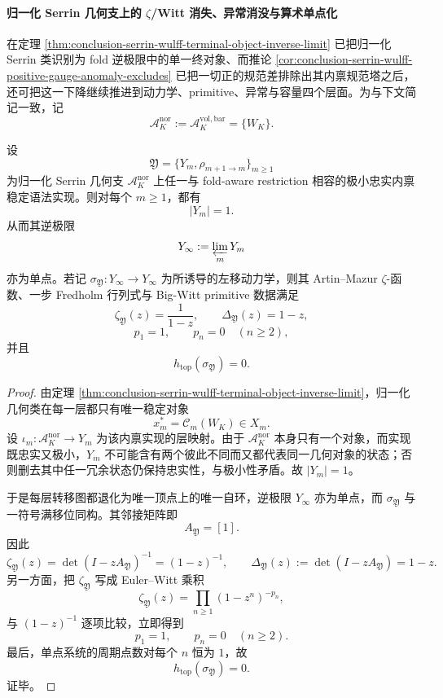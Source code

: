 \paragraph{归一化 Serrin 几何支上的 \texorpdfstring{$\zeta$}{zeta}/Witt 消失、异常消没与算术单点化}
在定理 \ref{thm:conclusion-serrin-wulff-terminal-object-inverse-limit} 已把归一化 Serrin 类识别为 fold 逆极限中的单一终对象、而推论 \ref{cor:conclusion-serrin-wulff-positive-gauge-anomaly-excludes} 已把一切正的规范差排除出其内禀规范塔之后，还可把这一下降继续推进到动力学、primitive、异常与容量四个层面。为与下文简记一致，记
\[
\mathcal A_K^{\mathrm{nor}}:=\mathcal A_K^{\mathrm{vol,bar}}=\{W_K\}.
\]

\begin{theorem}\label{thm:conclusion-serrin-wulff-artin-mazur-witt-triple-collapse}
设
\[
\mathfrak Y=\{Y_m,\rho_{m+1\to m}\}_{m\ge 1}
\]
为归一化 Serrin 几何支 \(\mathcal A_K^{\mathrm{nor}}\) 上任一与 fold-aware restriction 相容的极小忠实内禀稳定语法实现。则对每个 \(m\ge 1\)，都有
\[
|Y_m|=1.
\]
从而其逆极限
\[
Y_\infty:=\varprojlim_m Y_m
\]
亦为单点。若记 \(\sigma_{\mathfrak Y}:Y_\infty\to Y_\infty\) 为所诱导的左移动力学，则其 Artin--Mazur \(\zeta\)-函数、一步 Fredholm 行列式与 Big-Witt primitive 数据满足
\[
\zeta_{\mathfrak Y}(z)=\frac{1}{1-z},
\qquad
\Delta_{\mathfrak Y}(z)=1-z,
\]
\[
p_1=1,
\qquad
p_n=0\quad(n\ge 2),
\]
并且
\[
h_{\mathrm{top}}(\sigma_{\mathfrak Y})=0.
\]
\end{theorem}
\begin{proof}
由定理 \ref{thm:conclusion-serrin-wulff-terminal-object-inverse-limit}，归一化几何类在每一层都只有唯一稳定对象
\[
x_m^\ast=\mathscr C_m(W_K)\in X_m.
\]
设 \(\iota_m:\mathcal A_K^{\mathrm{nor}}\to Y_m\) 为该内禀实现的层映射。由于 \(\mathcal A_K^{\mathrm{nor}}\) 本身只有一个对象，而实现既忠实又极小，\(Y_m\) 不可能含有两个彼此不同而又都代表同一几何对象的状态；否则删去其中任一冗余状态仍保持忠实性，与极小性矛盾。故 \(|Y_m|=1\)。

于是每层转移图都退化为唯一顶点上的唯一自环，逆极限 \(Y_\infty\) 亦为单点，而 \(\sigma_{\mathfrak Y}\) 与一符号满移位同构。其邻接矩阵即
\[
A_{\mathfrak Y}=[1].
\]
因此
\[
\zeta_{\mathfrak Y}(z)
=
\det(I-zA_{\mathfrak Y})^{-1}
=
(1-z)^{-1},
\qquad
\Delta_{\mathfrak Y}(z):=\det(I-zA_{\mathfrak Y})=1-z.
\]
另一方面，把 \(\zeta_{\mathfrak Y}\) 写成 Euler--Witt 乘积
\[
\zeta_{\mathfrak Y}(z)=\prod_{n\ge 1}(1-z^n)^{-p_n},
\]
与 \((1-z)^{-1}\) 逐项比较，立即得到
\[
p_1=1,
\qquad
p_n=0\quad(n\ge 2).
\]
最后，单点系统的周期点数对每个 \(n\) 恒为 \(1\)，故
\[
h_{\mathrm{top}}(\sigma_{\mathfrak Y})=0.
\]
证毕。
\end{proof}

